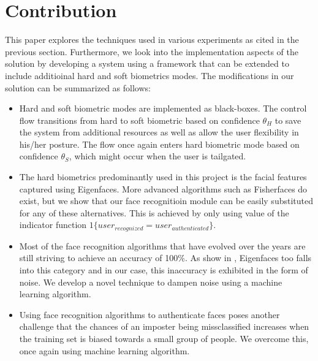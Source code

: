 \documentclass[%
        submission,
        notitlepage,
        narroweqnarray,
        inline,
        ]{ieee}
\begin{document}
\section{Contribution}
This paper explores the techniques used in various experiments as cited in the previous section.
Furthermore, we look into the implementation aspects of the solution by developing a system using a framework that can be extended to include additioinal hard and soft biometrics modes. 
The modifications in our solution can be summarized as follows:
\begin{itemize}
	\item Hard and soft biometric modes are implemented as black-boxes. The control flow transitions from hard to soft biometric based on confidence $\theta_{H}$ to save the system from additional resources as well as allow the user flexibility in his/her posture. The flow once again enters hard biometric mode based on confidence $\theta_{S}$, which might occur when the user is tailgated.
	\item The hard biometrics predominantly used in this project is the facial features captured using Eigenfaces\cite{Turk91}. More advanced algorithms such as Fisherfaces do exist, but we show that our face recognitioin module can be easily substituted for any of these alternatives. This is achieved by only using value of the indicator function $1\{user_{recognized}=user_{authenticated}\}$.
	\item Most of the face recognition algorithms that have evolved over the years are still striving to achieve an accuracy of 100\%. As show in \cite{fig:no_svm}, Eigenfaces too falls into this category and in our case, this inaccuracy is exhibited in the form of noise. We develop a novel technique to dampen noise using a machine learning algorithm.
	\item Using face recognition algorithms to authenticate faces poses another challenge that the chances of an imposter being missclassified increases when the training set is biased towards a small group of people. We overcome this, once again using machine learning algorithm.
\end{itemize}


\end{document}
